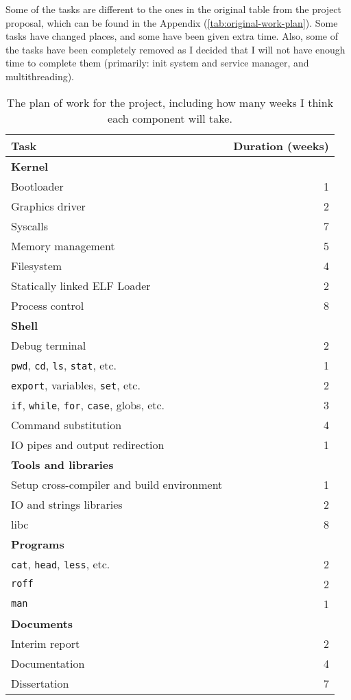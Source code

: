 \documentclass{article}
\begin{document}
Some of the tasks are different to the ones in the original table from the
project proposal, which can be found in the Appendix
(\autoref{tab:original-work-plan}). Some tasks have changed places, and some
have been given extra time. Also, some of the tasks have been completely
removed as I decided that I will not have enough time to complete them
(primarily: init system and service manager, and multithreading).

\begin{table}[tbp]
\begin{center}
\begin{tabular}{|l|r|}
    \hline
    Task & Duration (weeks) \\
    \hline \textbf{Kernel} & \\
    Bootloader & 1 \\
    Graphics driver & 2 \\
    Syscalls & 7 \\
    Memory management & 5 \\
    Filesystem & 4 \\
    Statically linked ELF Loader & 2 \\
    Process control & 8 \\
    \hline \textbf{Shell} & \\
    Debug terminal & 2 \\
    \texttt{pwd}, \texttt{cd}, \texttt{ls}, \texttt{stat}, etc. & 1 \\
    \texttt{export}, variables, \texttt{set}, etc. & 2 \\
    \texttt{if}, \texttt{while}, \texttt{for}, \texttt{case}, globs, etc. & 3 \\
    Command substitution & 4 \\
    IO pipes and output redirection & 1 \\
    \hline \textbf{Tools and libraries} & \\
    Setup cross-compiler and build environment & 1 \\
    IO and strings libraries & 2 \\
    libc & 8 \\
    \hline \textbf{Programs} & \\
    \texttt{cat}, \texttt{head}, \texttt{less}, etc. & 2 \\
    \texttt{roff} & 2 \\
    \texttt{man} & 1 \\
    \hline \textbf{Documents} & \\
    Interim report & 2 \\
    Documentation & 4 \\
    Dissertation & 7 \\
    \hline
\end{tabular}
\caption{The plan of work for the project, including how many weeks I think
each component will take.}
\label{tab:interim-work-plan}
\end{center}
\end{table}
\end{document}
